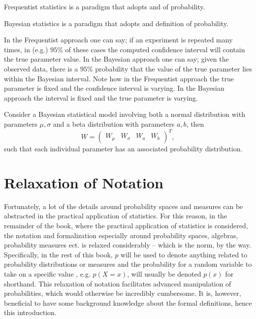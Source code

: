 \begin{definition}
	Frequentist statistics is a paradigm that adopts  and  of probability. 
\end{definition}

\begin{definition}
	\label{def:bayesian_statistics}
	Bayesian statistics is a paradigm that adopts  and definition  of probability. 
\end{definition}

\begin{example}
	\label{def:frequentist_statistics}
	In the Frequentist approach one can say; if an experiment is repeated many times, in (e.g.) $95 \%$ of these cases the computed confidence interval will contain the true parameter value.\newline
	In the Bayesian approach one can say; given the observed data, there is a $95 \%$ probability that the value of the true parameter lies within the Bayesian interval.\newline
	Note how in the Frequentist approach the true parameter is fixed and the confidence interval is varying. In the Bayesian approach the interval is fixed and the true parameter is varying. 
\end{example}

\begin{example}
	Consider a Bayesian statistical model involving both a normal distribution with parameters $\mu,\sigma$ and a beta distribution with parameters $a,b$, then
\begin{equation}
	W = \begin{pmatrix}
		W_\mu & W_\sigma & W_a & W_b
		\end{pmatrix}^T,
\end{equation}
such that each individual parameter has an associated probability distribution.
\end{example}

\section{Relaxation of Notation}
\label{sec:notation}
Fortunately, a lot of the details around probability spaces and measures can be abstracted in the practical application of statistics. For this reason, in the remainder of the book, where the practical application of statistics is considered, the notation and formalization especially around probability spaces, algebras, probability measures ect. is relaxed considerably -- which is the norm, by the way. Specifically, in the rest of this book, $p$ will be used to denote anything related to probability distributions or measures and the probability for a random variable to take on a specific value , e.g. $p(X=x)$, will usually be denoted $p(x)$ for shorthand. This relaxation of notation facilitates advanced manipulation of probabilities, which would otherwise be incredibly cumbersome. It is, however, beneficial to have some background knowledge about the formal definitions, hence this introduction.
